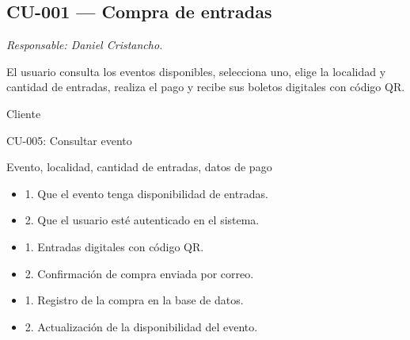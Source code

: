 
\subsection{CU-001 --- Compra de entradas}
\label{cu:cu-001}
\textit{Responsable: Daniel Cristancho.}

\begin{description}[leftmargin=!, labelwidth=3.4cm, style=nextline, topsep=3pt]
\item[Objetivo] El usuario consulta los eventos disponibles, selecciona uno, elige la localidad y cantidad de entradas, realiza el pago y recibe sus boletos digitales con código QR.

\item[Actores] Cliente

\item[CU relacionados] CU-005: Consultar evento

\item[Entradas] Evento, localidad, cantidad de entradas, datos de pago

\item[Pre-condiciones] \hfill
\begin{itemize}[leftmargin=1.2em, topsep=1pt]
  \item 1. Que el evento tenga disponibilidad de entradas.
  \item 2. Que el usuario esté autenticado en el sistema.
\end{itemize}

\item[Salidas] \hfill
\begin{itemize}[leftmargin=1.2em, topsep=1pt]
  \item 1. Entradas digitales con código QR.
  \item 2. Confirmación de compra enviada por correo.
\end{itemize}

\item[Post-condiciones] \hfill
\begin{itemize}[leftmargin=1.2em, topsep=1pt]
  \item 1. Registro de la compra en la base de datos.
  \item 2. Actualización de la disponibilidad del evento.
\end{itemize}

\end{description}

